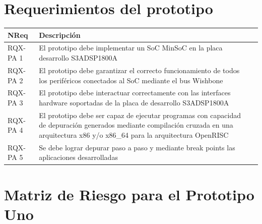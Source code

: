 	\section{Requerimientos del prototipo}
		\begin{table}[h]
		\centering
		\begin{tabular}{ p{2.5cm} p{8cm} p{3cm} }
		\hline 
		\rowcolor[gray]{0.8} N\textordmasculine Req & Descripción\\
		\hline 
		RQX-PA 1 & El prototipo debe implementar un SoC MinSoC en la placa desarrollo S3ADSP1800A\\ 
		\hline 
		RQX-PA 2 & El prototipo debe garantizar el correcto funcionamiento de todos los periféricos conectados al SoC mediante el bus Wishbone\\ 
		\hline 
		RQX-PA 3 & El prototipo debe interactuar correctamente con las interfaces hardware soportadas de la placa de desarrollo S3ADSP1800A\\ 
		\hline
		RQX-PA 4 & El prototipo debe ser capaz de ejecutar programas con capacidad de depuración generados mediante compilación
		cruzada en una arquitectura x86 y/o x86\_64 para la arquitectura OpenRISC\\
		\hline
		RQX-PA 5 & Se debe lograr depurar paso a paso y mediante break points las aplicaciones desarrolladas\\
		\hline		
		\end{tabular}
		\end{table}

\newpage
	
	\section{Matriz de Riesgo para el Prototipo Uno}

